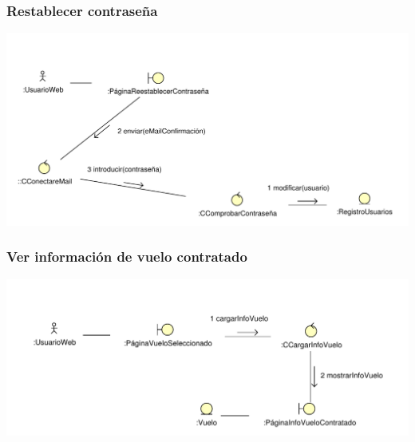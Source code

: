 \documentclass[11pt, a4paper, twoside, titlepage]{article}
\begin{document}
			\subsubsection{Restablecer contraseña}
				\begin{center}
					\includegraphics[scale=.77]{analisis/diagramas/restablecercontrasena.pdf}
				\end{center}

			\subsubsection{Ver información de vuelo contratado}
				\begin{center}
					\includegraphics[scale=.8]{analisis/diagramas/verinfovuelocontratado.pdf}
				\end{center}
\end{document}
